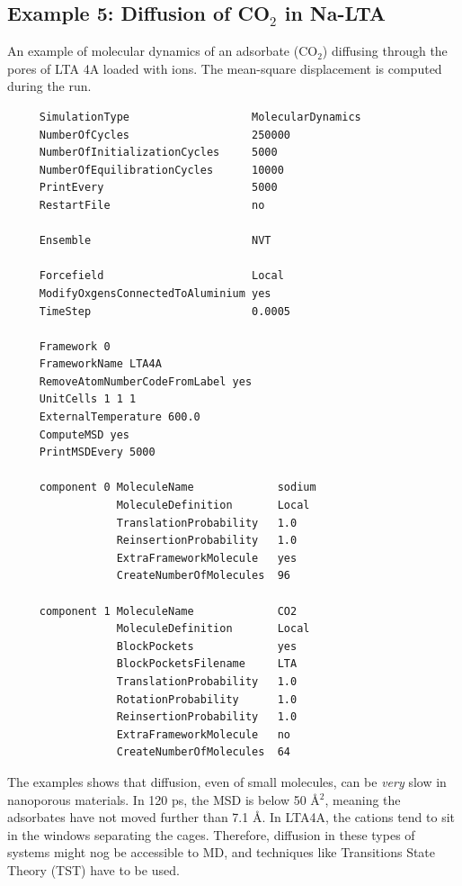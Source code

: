\subsection*{Example 5: Diffusion of CO$_2$ in Na-LTA}

An example of molecular dynamics of an adsorbate (CO$_2$) diffusing through the pores of LTA 4A loaded with ions.
The mean-square displacement is computed during the run.

\begin{tiny}
\begin{verbatim}
     SimulationType                   MolecularDynamics
     NumberOfCycles                   250000
     NumberOfInitializationCycles     5000
     NumberOfEquilibrationCycles      10000
     PrintEvery                       5000
     RestartFile                      no
     
     Ensemble                         NVT
     
     Forcefield                       Local
     ModifyOxgensConnectedToAluminium yes
     TimeStep                         0.0005
     
     Framework 0
     FrameworkName LTA4A
     RemoveAtomNumberCodeFromLabel yes
     UnitCells 1 1 1
     ExternalTemperature 600.0
     ComputeMSD yes
     PrintMSDEvery 5000
     
     component 0 MoleculeName             sodium
                 MoleculeDefinition       Local
                 TranslationProbability   1.0
                 ReinsertionProbability   1.0
                 ExtraFrameworkMolecule   yes
                 CreateNumberOfMolecules  96
     
     component 1 MoleculeName             CO2
                 MoleculeDefinition       Local
                 BlockPockets             yes
                 BlockPocketsFilename     LTA
                 TranslationProbability   1.0
                 RotationProbability      1.0
                 ReinsertionProbability   1.0
                 ExtraFrameworkMolecule   no
                 CreateNumberOfMolecules  64
\end{verbatim}
\end{tiny}

\noindent
The examples shows that diffusion, even of small molecules, can be \emph{very} slow in nanoporous materials.
In 120 ps, the MSD is below 50 \AA$^2$, meaning the adsorbates have not moved further than 7.1 \AA.
In LTA4A, the cations tend to sit in the windows separating the cages.
Therefore, diffusion in these types of systems might nog be accessible to MD, and techniques like Transitions State Theory (TST)
have to be used.

